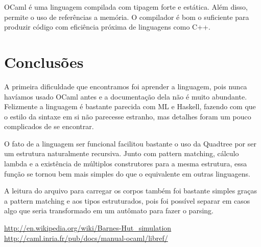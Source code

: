 \documentclass[a4paper,10pt]{article}
\begin{document}
		OCaml é uma linguagem compilada com tipagem forte e estática. Além disso, permite o uso de referências a memória. O compilador é bom o suficiente para produzir código com eficiência próxima de linguagens como C++.
	
\section{Conclusões}

	A primeira dificuldade que encontramos foi aprender a linguagem, pois nunca havíamos usado OCaml antes e a documentação dela não é muito abundante. Felizmente a linguagem é bastante parecida com ML e Haskell, fazendo com que o estilo da sintaxe em si não parecesse estranho, mas detalhes foram um pouco complicados de se encontrar.
	
	O fato de a linguagem ser funcional facilitou bastante o uso da Quadtree por ser um estrutura naturalmente recursiva. Junto com pattern matching, cálculo lambda e a existência de múltiplos construtores para a mesma estrutura, essa função se tornou bem mais simples do que o equivalente em outras linguagens.
	
	A leitura do arquivo para carregar os corpos também foi bastante simples graças a pattern matching e aos tipos estruturados, pois foi possível separar em casos algo que seria transformado em um autômato para fazer o parsing.
	
\begin{thebibliography}{4}
 \url{http://en.wikipedia.org/wiki/Barnes-Hut\_simulation}
 \url{http://caml.inria.fr/pub/docs/manual-ocaml/libref/}
 
\end{thebibliography}
\end{document}
